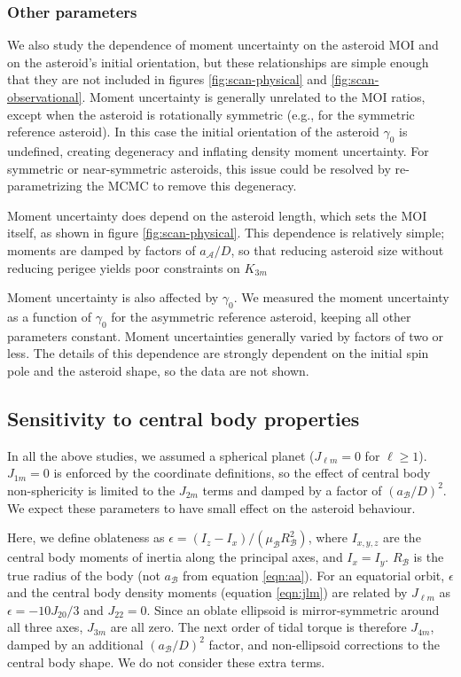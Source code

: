 \documentclass[fleqn,usenatbib]{mnras}
\begin{document}
\subsubsection{Other parameters}

We also study the dependence of moment uncertainty on the asteroid MOI and on the asteroid's initial orientation, but these relationships are simple enough that they are not included in figures \ref{fig:scan-physical} and \ref{fig:scan-observational}. Moment uncertainty is generally unrelated to the MOI ratios, except when the asteroid is rotationally symmetric (e.g., for the symmetric reference asteroid). In this case the initial orientation of the asteroid $\gamma_0$ is undefined, creating degeneracy and inflating density moment uncertainty. For symmetric or near-symmetric asteroids, this issue could be resolved by re-parametrizing the MCMC to remove this degeneracy.

Moment uncertainty does depend on the asteroid length, which sets the MOI itself, as shown in figure  \ref{fig:scan-physical}. This dependence is relatively simple; moments are damped by factors of $a_{\mathcal{A}} / D$, so that reducing asteroid size without reducing perigee yields poor constraints on $K_{3m}$

Moment uncertainty is also affected by $\gamma_0$. We measured the moment uncertainty as a function of $\gamma_0$ for the asymmetric reference asteroid, keeping all other parameters constant. Moment uncertainties generally varied by factors of two or less. The details of this dependence are strongly dependent on the initial spin pole and the asteroid shape, so the data are not shown.

\subsection{Sensitivity to central body properties}
\label{sec:central-body}

In all the above studies, we assumed a spherical planet ($J_{\ell m} = 0$ for $\ell \geq 1$). $J_{1m} = 0$ is enforced by the coordinate definitions, so the effect of central body non-sphericity is limited to the $J_{2m}$ terms and damped by a factor of $(a_\mathcal{B} / D)^2$. We expect these parameters to have small effect on the asteroid behaviour.

Here, we define oblateness as $\epsilon = (I_z - I_x)/(\mu_\mathcal{B} R_\mathcal{B}^2)$, where $I_{x,y,z}$ are the central body moments of inertia along the principal axes, and $I_x = I_y$. $R_\mathcal{B}$ is the true radius of the body (not $a_\mathcal{B}$ from equation \ref{eqn:aa}). For an equatorial orbit, $\epsilon$ and the central body density moments (equation \ref{eqn:jlm}) are related by $J_{\ell m}$ as $\epsilon = -10J_{20}/3$ and $J_{22} = 0$. Since an oblate ellipsoid is mirror-symmetric around all three axes, $J_{3m}$ are all zero. The next order of tidal torque is therefore $J_{4m}$, damped by an additional $(a_\mathcal{B}/D)^2$ factor, and non-ellipsoid corrections to the central body shape. We do not consider these extra terms.
\end{document}
